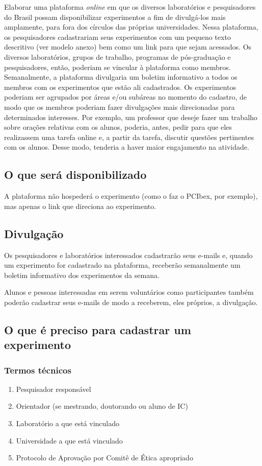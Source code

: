 \documentclass[11pt]{article}
\begin{document}
Elaborar uma plataforma \emph{online} em que os diversos laboratórios e pesquisadores do Brasil possam disponibilizar experimentos a fim de divulgá-los mais amplamente, para fora dos círculos das próprias universidades. Nessa plataforma, os pesquisadores cadastrariam seus experimentos com um pequeno texto descritivo (ver modelo anexo) bem como um link para que sejam acessados. Os diversos laboratórios, grupos de trabalho, programas de pós-graduação e pesquisadores, então, poderiam se vincular à plataforma como membros. Semanalmente, a plataforma divulgaria um boletim informativo a todos os membros com os experimentos que estão ali cadastrados. Os experimentos poderiam ser agrupados por áreas e/ou subáreas no momento do cadastro, de modo que os membros poderiam fazer divulgações mais direcionadas para determinados interesses. Por exemplo, um professor que deseje fazer um trabalho sobre orações relativas com os alunos, poderia, antes, pedir para que eles realizassem uma tarefa online e, a partir da tarefa, discutir questões pertinentes com os alunos. Desse modo, tenderia a haver maior engajamento na atividade.

\subsection{O que será disponibilizado}
\label{sec:org2a39bf9}

A plataforma não hospederá o experimento (como o faz o PCIbex, por exemplo), mas apenas o link que direciona ao experimento.

\subsection{Divulgação}
\label{sec:org29edcd1}

Os pesquisadores e laboratórios interessados cadastrarão seus e-mails e, quando um experimento for cadastrado na plataforma, receberão semanalmente um boletim informativo dos experimentos da semana.

Alunos e pessoas interessadas em serem voluntários como participantes também poderão cadastrar seus e-mails de modo a receberem, eles próprios, a divulgação.

\subsection{O que é preciso para cadastrar um experimento}
\label{sec:org43eb102}
\subsubsection{Termos técnicos}
\label{sec:orgc0c2f00}
\begin{enumerate}
\item Pesquisador responsável
\item Orientador (se mestrando, doutorando ou aluno de IC)
\item Laboratório a que está vinculado
\item Universidade a que está vinculado
\item Protocolo de Aprovação por Comitê de Ética apropriado
\end{enumerate}
\end{document}
